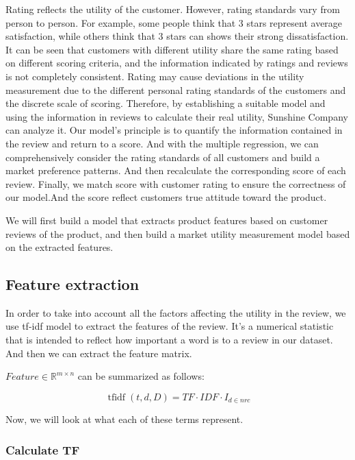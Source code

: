 \documentclass[12pt,a4paper,]{article}
\begin{document}
Rating reflects the utility of the customer. However, rating standards
vary from person to person. For example, some people think that 3 stars
represent average satisfaction, while others think that 3 stars can
shows their strong dissatisfaction. It can be seen that customers with
different utility share the same rating based on different scoring
criteria, and the information indicated by ratings and reviews is not
completely consistent. Rating may cause deviations in the utility
measurement due to the different personal rating standards of the
customers and the discrete scale of scoring. Therefore, by establishing
a suitable model and using the information in reviews to calculate their
real utility, Sunshine Company can analyze it. Our model's principle is
to quantify the information contained in the review and return to a
score. And with the multiple regression, we can comprehensively consider
the rating standards of all customers and build a market preference
patterns. And then recalculate the corresponding score of each review.
Finally, we match score with customer rating to ensure the correctness
of our model.And the score reflect customers true attitude toward the
product.

We will first build a model that extracts product features based on
customer reviews of the product, and then build a market utility
measurement model based on the extracted features.

\hypertarget{feature-extraction}{%
\subsection{Feature extraction}\label{feature-extraction}}

In order to take into account all the factors affecting the utility in
the review, we use tf-idf model to extract the features of the review.
It's a numerical statistic that is intended to reflect how important a
word is to a review in our dataset. And then we can extract the feature
matrix.

\(Feature\in\mathbb{R}^{m\times n}\) can be summarized as follows:

\begin{equation}
\operatorname{tfidf}(t, d, D)=TF \cdot IDF \cdot I_{d\in nrc}
\end{equation}

Now, we will look at what each of these terms represent.

\hypertarget{calculate-tf}{%
\subsubsection{Calculate TF}\label{calculate-tf}}
\end{document}
